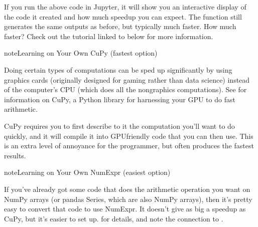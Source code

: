 \documentclass[letterpaper,10pt,english]{jupyterBook}
\begin{document}
\begin{sphinxVerbatim}[commandchars=\\\{\}]
 
        
            
      
          
          
     
\end{sphinxVerbatim}

\sphinxAtStartPar
If you run the above code in Jupyter, it will show you an interactive display of the code it created and how much speedup you can expect.  The function still generates the same outputs as before, but typically much faster.  How much faster?  Check out the tutorial linked to below for more information.

\begin{sphinxadmonition}{note}{Learning on Your Own \sphinxhyphen{} CuPy (fastest option)}

\sphinxAtStartPar
Doing certain types of computations can be sped up significantly by using graphics cards (originally designed for gaming rather than data science) instead of the computer’s CPU (which does all the non\sphinxhyphen{}graphics computations).  See  for information on CuPy, a Python library for harnessing your GPU to do fast arithmetic.

\sphinxAtStartPar
CuPy requires you to first describe to it the computation you’ll want to do quickly, and it will compile it into GPU\sphinxhyphen{}friendly code that you can then use.  This is an extra level of annoyance for the programmer, but often produces the fastest results.
\end{sphinxadmonition}

\begin{sphinxadmonition}{note}{Learning on Your Own \sphinxhyphen{} NumExpr (easiest option)}

\sphinxAtStartPar
If you’ve already got some code that does the arithmetic operation you want on NumPy arrays (or pandas Series, which are also NumPy arrays), then it’s pretty easy to convert that code to use NumExpr.  It doesn’t give as big a speedup as CuPy, but it’s easier to set up.   for details, and note the connection to .
\end{sphinxadmonition}
\end{document}
